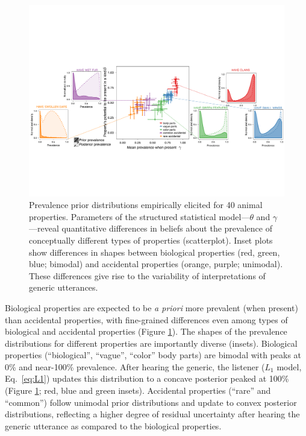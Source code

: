 \documentclass{pnastwo}
\begin{document}
\begin{article}
\begin{figure}
\centering
    \includegraphics[width=1.9\columnwidth]{prevalence-asymmetry-scatterwDists-byItem3.pdf}
    \caption{Prevalence prior distributions empirically elicited for 40 animal properties.
    Parameters of the structured statistical model---$\theta$ and $\gamma$---reveal quantitative differences in beliefs about the prevalence of conceptually different types of properties (scatterplot). 
    Inset plots show differences in shapes between biological properties (red, green, blue; bimodal) and accidental properties (orange, purple; unimodal).   
  These differences give rise to the variability of interpretations of generic utterances. 
  }
  \label{fig:prior2}
\end{figure}


Biological properties are expected to be \emph{a priori} more prevalent (when present) than accidental properties, with fine-grained differences even among types of biological and accidental properties (Figure \ref{fig:prior2}).
The shapes of the prevalence distributions for different properties are importantly diverse (insets). 
Biological properties (``biological'', ``vague'', ``color'' body parts) are bimodal with peaks at 0\% and near-100\% prevalence. 
After hearing the generic, the listener ($L_1$ model, Eq.~\ref{eq:L1}) updates this distribution to a concave posterior peaked at 100\% (Figure \ref{fig:prior2}; red, blue and green insets). 
Accidental properties (``rare'' and ``common'') follow unimodal prior distributions and update to convex posterior distributions, reflecting a higher degree of residual uncertainty after hearing the generic utterance as compared to the biological properties. 


\end{article}
\end{document}
